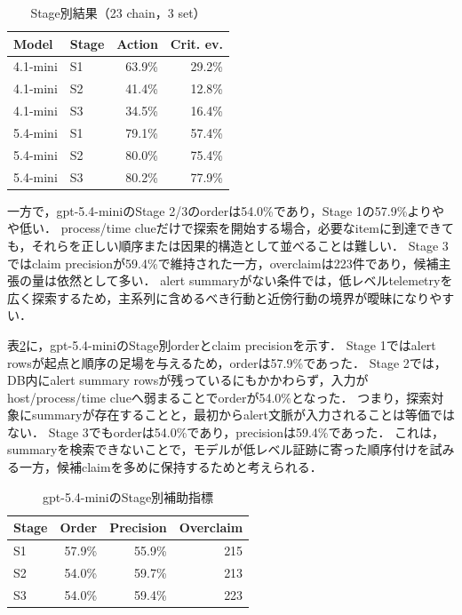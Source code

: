 \documentclass[dvipdfmx]{FITpaper}
\newcommand{\model}[1]{\mbox{\textrm{#1}}}
\begin{document}
\begin{table}[ht]
    \centering
    \caption{Stage別結果（23 chain，3 set）}
    \label{table:bystage}
    \begin{tabular}{llrr}
        \toprule
        Model & Stage & Action & Crit. ev. \\
        \midrule
        \model{4.1-mini} & S1 & 63.9\% & 29.2\% \\
        \model{4.1-mini} & S2 & 41.4\% & 12.8\% \\
        \model{4.1-mini} & S3 & 34.5\% & 16.4\% \\
        \model{5.4-mini} & S1 & 79.1\% & 57.4\% \\
        \model{5.4-mini} & S2 & 80.0\% & 75.4\% \\
        \model{5.4-mini} & S3 & 80.2\% & 77.9\% \\
        \bottomrule
    \end{tabular}
\end{table}

一方で，\model{gpt-5.4-mini}のStage 2/3のorderは54.0\%であり，Stage 1の57.9\%よりやや低い．
process/time clueだけで探索を開始する場合，必要なitemに到達できても，それらを正しい順序または因果的構造として並べることは難しい．
Stage 3ではclaim precisionが59.4\%で維持された一方，overclaimは223件であり，候補主張の量は依然として多い．
alert summaryがない条件では，低レベルtelemetryを広く探索するため，主系列に含めるべき行動と近傍行動の境界が曖昧になりやすい．

表\ref{table:stageorder}に，\model{gpt-5.4-mini}のStage別orderとclaim precisionを示す．
Stage 1ではalert rowsが起点と順序の足場を与えるため，orderは57.9\%であった．
Stage 2では，DB内にalert summary rowsが残っているにもかかわらず，入力がhost/process/time clueへ弱まることでorderが54.0\%となった．
つまり，探索対象にsummaryが存在することと，最初からalert文脈が入力されることは等価ではない．
Stage 3でもorderは54.0\%であり，precisionは59.4\%であった．
これは，summaryを検索できないことで，モデルが低レベル証跡に寄った順序付けを試みる一方，候補claimを多めに保持するためと考えられる．

\begin{table}[ht]
    \centering
    \caption{\model{gpt-5.4-mini}のStage別補助指標}
    \label{table:stageorder}
    \begin{tabular}{lrrr}
        \toprule
        Stage & Order & Precision & Overclaim \\
        \midrule
        S1 & 57.9\% & 55.9\% & 215 \\
        S2 & 54.0\% & 59.7\% & 213 \\
        S3 & 54.0\% & 59.4\% & 223 \\
        \bottomrule
    \end{tabular}
\end{table}
\end{document}
